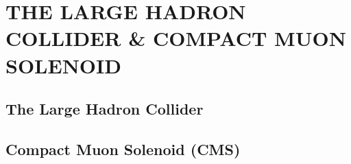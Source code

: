%
%
%



\chapter{\uppercase {The Large Hadron Collider \& Compact Muon Solenoid}}

\section{The Large Hadron Collider}

\section{Compact Muon Solenoid (CMS)}
